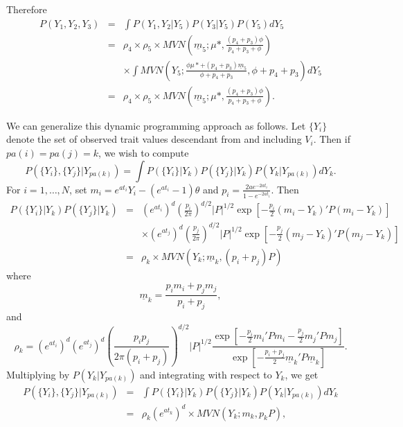 \documentclass[12pt]{article}
\begin{document}
Therefore
\begin{eqnarray}
P(Y_1,Y_2,Y_3) & = & \int P(Y_1,Y_2| Y_5) P(Y_3 | Y_5) P(Y_5) dY_5 \\
& = & \rho_4 \times \rho_5 \times MVN(\underline{m}_5;\mu*, \frac{(p_4 + p_3)\phi}{p_4 + p_3 + \phi}) \\
& & \times \int MVN \left(Y_5; \frac{\phi \mu* + (p_4 + p_3) \underline{m}_5 }{\phi + p_4 + p_3}, \phi + p_4 + p_3 \right) dY_5 \\
& = & \rho_4 \times \rho_5 \times MVN \left(\underline{m}_5;\mu*, \frac{(p_4 + p_3)\phi}{p_4 + p_3 + \phi} \right) .
\end{eqnarray}
\par
We can generalize this dynamic programming approach as follows.  Let $\{Y_i \}$ denote the set of observed trait values descendant from and including
$V_i$.  Then if $pa(i) = pa(j) = k$, we wish to compute
\begin{equation}
P( \{Y_i \}, \{ Y_j \} | Y_{pa(k)} ) = \int P(\{Y_i \} | Y_k) P(\{Y_j \} | Y_k) P(Y_k | Y_{pa(k)}) dY_k .
\end{equation}
For $i = 1, \dots , N$, set $m_i = e^{at_i} Y_i - (e^{at_i} - 1) \theta $ and $p_i = \frac{2ae^{-2at_i}}{1-e^{-2at_i}} $.  Then
\begin{eqnarray}
P(\{Y_i \} | Y_k) P(\{Y_j \} | Y_k) & = &  ( e^{at_i} )^d \left( \frac{p_i}{2 \pi} \right) ^{d/2} |P|^{1/2}
\exp \left[ -\frac{p_i}{2}(m_i - Y_k)' P (m_i - Y_k)    \right]  \\
& & \times ( e^{at_j} )^d \left( \frac{p_j}{2 \pi} \right) ^{d/2} |P|^{1/2} \exp \left[ -\frac{p_j}{2}(m_j - Y_k)' P (m_j - Y_k)    \right] \\
& = & \rho_k \times MVN(Y_k; \underline{m}_k, (p_i + p_j) P)
\end{eqnarray}
where 
\begin{equation}
\underline{m}_k = \frac{p_i m_i + p_j m_j}{p_i + p_j} ,
\end{equation}
and
\begin{equation}
\rho_k =  ( e^{at_i} )^d ( e^{at_j} )^d \left( \frac{p_i p_j}{2 \pi (p_i + p_j)} \right)^{d/2}  |P|^{1/2} \frac {\exp \left[ -\frac{p_i}{2} m_i' P m_i -\frac{p_j}{2}m_j'P m_j  \right] }
{ \exp \left[ -\frac{p_i + p_j}{2} \underline{m}_k' P \underline{m}_k \right] } .
\end{equation}
Multiplying by $P(Y_k | Y_{pa(k)})$ and integrating with respect to $Y_k$, we get 
\begin{eqnarray}
P( \{Y_i \}, \{Y_j \} | Y_{pa(k)} ) & = & \int P(\{Y_i \} | Y_k) P(\{Y_j \} | Y_k) P(Y_k | Y_{pa(k)}) dY_k \\
& = &  \rho_k ( e^{at_k} )^d \times MVN(Y_k; m_k, p_k P),
\end{eqnarray}
\end{document}
